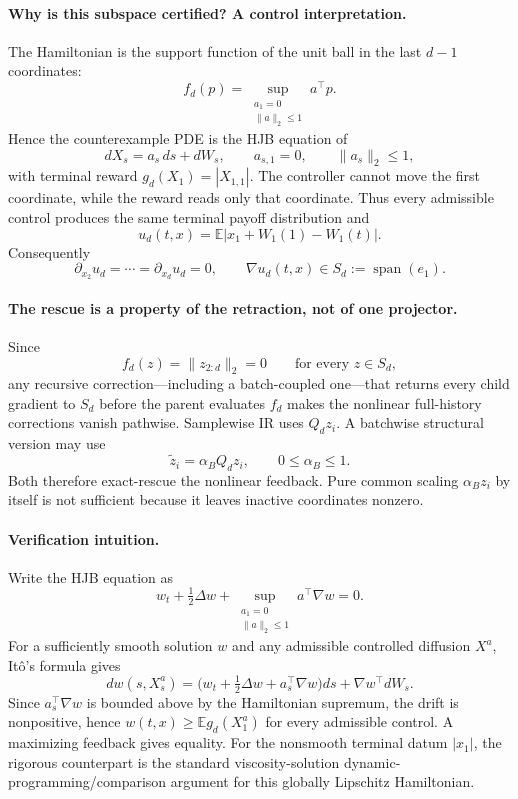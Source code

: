 \paragraph{Why is this subspace certified? A control interpretation.}
The Hamiltonian is the support function of the unit ball in the last
$d-1$ coordinates:
\begin{equation}
 f_d(p)=\sup_{\substack{a_1=0\\\|a\|_2\le1}} a^\top p.
\end{equation}
Hence the counterexample PDE is the HJB equation of
\[
 dX_s=a_s\,ds+dW_s,
 \qquad a_{s,1}=0,
 \qquad \|a_s\|_2\le1,
\]
with terminal reward $g_d(X_1)=|X_{1,1}|$. The controller cannot move the
first coordinate, while the reward reads only that coordinate. Thus every
admissible control produces the same terminal payoff distribution and
\[
 u_d(t,x)=\mathbb E|x_1+W_1(1)-W_1(t)|.
\]
Consequently
\[
 \partial_{x_2}u_d=\cdots=\partial_{x_d}u_d=0,
 \qquad
 \nabla u_d(t,x)\in S_d:=\operatorname{span}(e_1).
\]

\paragraph{The rescue is a property of the retraction, not of one projector.}
Since
\[
 f_d(z)=\|z_{2:d}\|_2=0\qquad\text{for every }z\in S_d,
\]
any recursive correction---including a batch-coupled one---that returns every
child gradient to $S_d$ before the parent evaluates $f_d$ makes the nonlinear
full-history corrections vanish pathwise. Samplewise IR uses $Q_dz_i$.
A batchwise structural version may use
\[
 \widetilde z_i=\alpha_BQ_dz_i,\qquad0\le\alpha_B\le1.
\]
Both therefore exact-rescue the nonlinear feedback. Pure common scaling
$\alpha_Bz_i$ by itself is not sufficient because it leaves inactive
coordinates nonzero.

\paragraph{Verification intuition.}
Write the HJB equation as
\[
 w_t+\tfrac12\Delta w+
 \sup_{\substack{a_1=0\\\|a\|_2\le1}} a^\top\nabla w=0.
\]
For a sufficiently smooth solution $w$ and any admissible controlled
diffusion $X^a$, It\^o's formula gives
\[
 dw(s,X_s^a)=
 \bigl(w_t+\tfrac12\Delta w+a_s^\top\nabla w\bigr)ds
 +\nabla w^\top dW_s.
\]
Since $a_s^\top\nabla w$ is bounded above by the Hamiltonian supremum, the
drift is nonpositive, hence $w(t,x)\ge\mathbb E g_d(X_1^a)$ for every
admissible control. A maximizing feedback gives equality. For the nonsmooth
terminal datum $|x_1|$, the rigorous counterpart is the standard
viscosity-solution dynamic-programming/comparison argument for this globally
Lipschitz Hamiltonian.
